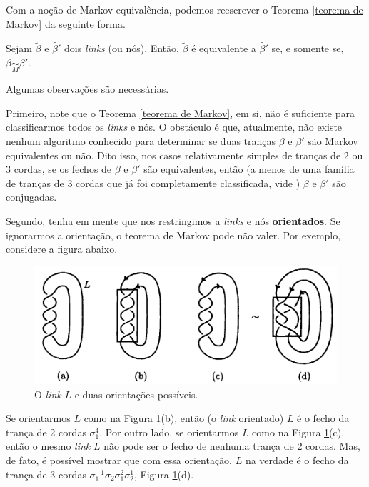	Com a noção de Markov equivalência, podemos reescrever o Teorema \ref{teorema de Markov} da seguinte forma.
	\begin{theorem}
	\label{teorema de Markov simplificado}
		Sejam $\widetilde{\beta}$ e $\widetilde{\beta'}$ dois \textit{links} (ou nós). 
		Então, $\widetilde{\beta}$ é equivalente a $\widetilde{\beta'}$ se, e somente se,
		$\beta\underset{M}{\sim}\beta'$.
	\end{theorem}
	Algumas observações são necessárias.
	\begin{remark}
		Primeiro, note que o Teorema \ref{teorema de Markov}, em si, não é suficiente para 
		classificarmos todos os \textit{links} e nós. O obstáculo é que, atualmente, não 
		existe nenhum algoritmo conhecido para determinar se duas tranças $\beta$ e $\beta'$ 
		são Markov equivalentes ou não. Dito isso, nos casos relativamente simples de tranças 
		de 2 ou 3 cordas, se os fechos de $\beta$ e $\beta'$ são equivalentes, então 
		(a menos de uma família de tranças de 3 cordas que já foi completamente classificada, 
		vide \cite{classificacao}) 
		$\beta$ e $\beta'$ são conjugadas.
		
		\par\vspace{0.3cm} Segundo, tenha em mente que nos restringimos a \textit{links} e 
		nós \textbf{orientados}. Se ignorarmos a orientação, o teorema de Markov pode não valer. 
		Por exemplo, considere a figura abaixo.
		\begin{figure}[H]
			\begin{center}
				\includegraphics[width=12cm]{Images/orientacao_markov_link.png}
			\end{center}\caption{O \textit{link} $L$ e duas orientações possíveis.}\label{orientacao markov link}
		\end{figure}
		Se orientarmos $L$ como na Figura \ref{orientacao markov link}(b), então 
		(o \textit{link} orientado) $L$ é o fecho da trança de 2 cordas $\sigma_1^4$. 
		Por outro lado, se orientarmos $L$ como na Figura \ref{orientacao markov link}(c), 
		então o mesmo \textit{link} $L$ não pode ser o fecho de nenhuma trança de 2 cordas. 
		Mas, de fato, é possível mostrar que com essa orientação, $L$ na verdade é o fecho 
		da trança de 3 cordas $\sigma_1^{-1}\sigma_2\sigma_1^{2}\sigma_2^{1}$, 
		Figura \ref{orientacao markov link}(d).
		

\end{remark}

